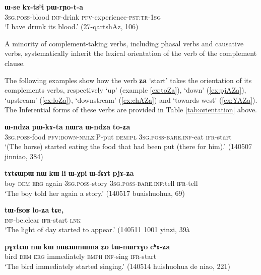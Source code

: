 \documentclass[oneside,a4paper,11pt]{article}
\newcommand{\ipa}[1]{\textbf{\phon#1}} %
\newcommand{\jpg}[2]{\ipa{#1} `#2'} %
\newcommand{\refb}[1]{(\ref{#1})}
\begin{document}
\begin{exe}
\ex \label{ex:Wse}
\gll
\ipa{ɯ-se} 	\ipa{kɤ-tsʰi} 	\ipa{pɯ-rɲo-t-a} \\
\textsc{3sg.poss}-blood \textsc{inf}-drink \textsc{pfv}-experience-\textsc{pst:tr-1sg} \\
\glt `I have drunk its blood.' (27-qartshAz, 106)
\end{exe}

A minority of complement-taking verbs, including phasal verbs and causative verbs, systematically inherit the lexical orientation of the verb of the complement clause. 

The following examples show how the verb \jpg{ʑa}{start} takes the orientation of its complements verbs, respectively `up' (example \ref{ex:toZa}), `down' \refb{ex:pjAZa}, `upstream' \refb{ex:loZa}, `downstream' \refb{ex:chAZa} and `towards west' \refb{ex:YAZa}. The Inferential forms of these verbs are provided in Table \ref{tab:orientation} above.

\begin{exe}
\ex \label{ex:toZa}
\gll \ipa{ɯ-ndza} 	\ipa{pɯ-kɤ-ta} 	\ipa{nɯra} 	\ipa{ɯ-ndza} 	\ipa{to-ʑa} \\
\textsc{3sg.poss}-food \textsc{pfv:down-nmlz:P}-put \textsc{dem:pl} \textsc{3sg.poss-bare.inf}-eat \textsc{ifr}-start \\
\glt `(The horse) started eating the food that had been put (there for him).' (140507 jinniao, 384)
\end{exe}

\begin{exe}
\ex \label{ex:pjAZa}
\gll
\ipa{tɤtɕɯpɯ} 	\ipa{nɯ} 	\ipa{kɯ} 	\ipa{li} \ipa{ɯ-χpi} 	\ipa{ɯ-fɕɤt} 	\ipa{pjɤ-ʑa} \\
boy \textsc{dem} \textsc{erg} again \textsc{3sg.poss}-story \textsc{3sg.poss-bare.inf}:tell \textsc{ifr}-tell \\
\glt `The boy told her again a story.' (140517 buaishuohua, 69)
\end{exe}

\begin{exe}
\ex \label{ex:loZa}
\gll
\ipa{tɯ-fsoʁ} 	\ipa{lo-ʑa} 	\ipa{tɕe,} \\
\textsc{inf}-be.clear \textsc{ifr}-start \textsc{lnk} \\
\glt `The light of day started to appear.' (140511 1001 yinzi, 39à
\end{exe}

\begin{exe}
\ex \label{ex:chAZa}
\gll \ipa{pɣɤtɕɯ} 	\ipa{nɯ} 	\ipa{kɯ} 	\ipa{nɯɕɯmɯma} 	\ipa{ʑo} 	\ipa{tɯ-nɯrɤɣo} 	\ipa{cʰɤ-ʑa} \\
bird \textsc{dem} \textsc{erg} immediately \textsc{emph} \textsc{inf}-sing \textsc{ifr}-start \\
\glt `The bird immediately started singing.' (140514 huishuohua de niao, 221)
\end{exe}
\end{document}
